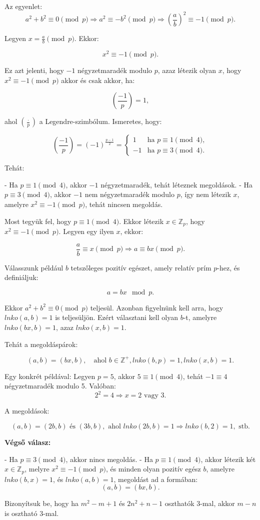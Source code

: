\begin{solution}
Az egyenlet: 
\[
a^{2}+b^{2}\equiv0\pmod p\Rightarrow a^{2}\equiv-b^{2}\pmod p\Rightarrow\left(\frac{a}{b}\right)^{2}\equiv-1\pmod p.
\]

Legyen $x=\frac{a}{b}\pmod p$. Ekkor:

\[
x^{2}\equiv-1\pmod p.
\]

Ez azt jelenti, hogy $-1$ négyzetmaradék modulo $p$, azaz létezik
olyan $x$, hogy $x^{2}\equiv-1\pmod p$ akkor és csak akkor, ha:

\[
\left(\frac{-1}{p}\right)=1,
\]

ahol $\left(\frac{\cdot}{p}\right)$ a Legendre-szimbólum. Ismeretes,
hogy:

\[
\left(\frac{-1}{p}\right)=(-1)^{\frac{p-1}{2}}=\begin{cases}
1 & \text{ha }p\equiv1\pmod 4,\\
-1 & \text{ha }p\equiv3\pmod 4.
\end{cases}
\]

Tehát:

- Ha $p\equiv1\pmod 4$, akkor $-1$ négyzetmaradék, tehát léteznek
megoldások. - Ha $p\equiv3\pmod 4$, akkor $-1$ nem négyzetmaradék
modulo $p$, így nem létezik $x$, amelyre $x^{2}\equiv-1\pmod p$,
tehát nincsen megoldás.

\medskip{}

Most tegyük fel, hogy $p\equiv1\pmod 4$. Ekkor létezik $x\in\mathbb{Z}_{p}$,
hogy $x^{2}\equiv-1\pmod p$. Legyen egy ilyen $x$, ekkor:

\[
\frac{a}{b}\equiv x\pmod p\Rightarrow a\equiv bx\pmod p.
\]

Válasszunk például $b$ tetszőleges pozitív egészet, amely relatív
prím $p$-hez, és definiáljuk:

\[
a=bx\mod p.
\]

Ekkor $a^{2}+b^{2}\equiv0\pmod p$ teljesül. Azonban figyelnünk kell
arra, hogy $lnko(a,b)=1$ is teljesüljön. Ezért választani kell olyan
$b$-t, amelyre $lnko(bx,b)=1$, azaz $lnko(x,b)=1$.

Tehát a megoldáspárok:

\[
(a,b)=(bx,b),\quad\text{ahol }b\in\mathbb{Z}^{+},lnko(b,p)=1,lnko(x,b)=1.
\]

Egy konkrét példával: Legyen $p=5$, akkor $5\equiv1\pmod 4$, tehát
$-1\equiv4$ négyzetmaradék modulo 5. Valóban: 
\[
2^{2}=4\Rightarrow x=2\text{ vagy }3.
\]

A megoldások:

\[
(a,b)=(2b,b)\text{ és }(3b,b),\text{ ahol }lnko(2b,b)=1\Rightarrow lnko(b,2)=1,\text{ stb.}
\]

\textbf{Végső válasz:}

- Ha $p\equiv3\pmod 4$, akkor nincs megoldás. - Ha $p\equiv1\pmod 4$,
akkor létezik két $x\in\mathbb{Z}_{p}$, melyre $x^{2}\equiv-1\pmod p$,
és minden olyan pozitív egész $b$, amelyre $lnko(b,x)=1$, és $lnko(a,b)=1$,
megoldást ad a formában: 
\[
(a,b)=(bx,b).
\]
\end{solution}
\begin{extraproblem}
Bizonyítsuk be, hogy ha $m^{2}-m+1$ és $2n^{2}+n-1$ oszthatók 3-mal,
akkor $m-n$ is osztható 3-mal.
\end{extraproblem}

